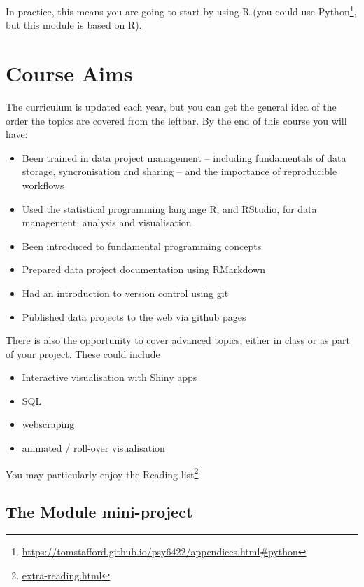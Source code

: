 \documentclass[
  12pt,
  a5paper,
]{book}
\DeclareRobustCommand{\href}[2]{#2\footnote{\url{#1}}}
\providecommand{\tightlist}{%
  \setlength{\itemsep}{0pt}\setlength{\parskip}{0pt}}
\begin{document}
In practice, this means you are going to start by using R (you could use \href{https://tomstafford.github.io/psy6422/appendices.html\#python}{Python}, but this module is based on R).

\hypertarget{course-aims}{%
\section{Course Aims}\label{course-aims}}

The curriculum is updated each year, but you can get the general idea of the order the topics are covered from the leftbar. By the end of this course you will have:

\begin{itemize}
\tightlist
\item
  Been trained in data project management -- including fundamentals of data storage, syncronisation and sharing -- and the importance of reproducible workflows
\item
  Used the statistical programming language R, and RStudio, for data management, analysis and visualisation
\item
  Been introduced to fundamental programming concepts
\item
  Prepared data project documentation using RMarkdown
\item
  Had an introduction to version control using git
\item
  Published data projects to the web via github pages
\end{itemize}

There is also the opportunity to cover advanced topics, either in class or as part of your project. These could include

\begin{itemize}
\tightlist
\item
  Interactive visualisation with Shiny apps
\item
  SQL
\item
  webscraping
\item
  animated / roll-over visualisation
\end{itemize}

You may particularly enjoy the \href{extra-reading.html}{Reading list}

\hypertarget{the-module-mini-project}{%
\subsection{The Module mini-project}\label{the-module-mini-project}}
\end{document}
